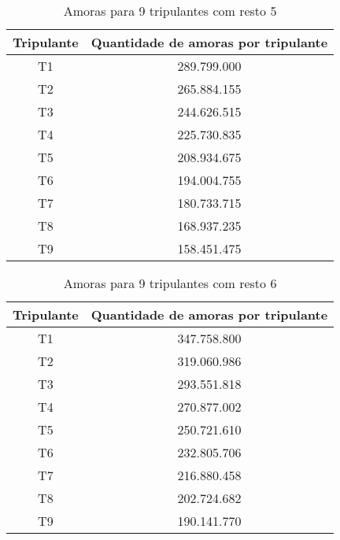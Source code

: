 \documentclass[12pt]{article}
\begin{document}
\begin{table}[H]

\centering

\begin{tabular}{|c|c|}

\hline
Tripulante & Quantidade de amoras por tripulante \\
\hline
T1 & 289.799.000 \\
\hline
T2 & 265.884.155 \\
\hline
T3 & 244.626.515 \\
\hline
T4 & 225.730.835 \\
\hline
T5 & 208.934.675 \\
\hline
T6 & 194.004.755 \\
\hline
T7 & 180.733.715 \\
\hline
T8 & 168.937.235 \\
\hline
T9 & 158.451.475 \\
\hline

\end{tabular}
\label{Tabela15}
\caption{Amoras para 9 tripulantes com resto 5}

\end{table}

\begin{table}[H]

\centering

\begin{tabular}{|c|c|}

\hline
Tripulante & Quantidade de amoras por tripulante \\
\hline
T1 & 347.758.800 \\
\hline
T2 & 319.060.986 \\
\hline
T3 & 293.551.818 \\
\hline
T4 & 270.877.002 \\
\hline
T5 & 250.721.610 \\
\hline
T6 & 232.805.706 \\
\hline
T7 & 216.880.458 \\
\hline
T8 & 202.724.682 \\
\hline
T9 & 190.141.770 \\
\hline

\end{tabular}
\label{Tabela16}
\caption{Amoras para 9 tripulantes com resto 6}

\end{table}
\end{document}
